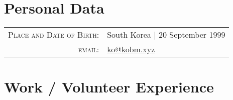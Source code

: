 \documentclass[a4paper,10pt]{article} %
\begin{document}
\pagestyle{empty} %


\par{\bigskip\par} %

\section{Personal Data}

\begin{tabular}{rl}
\textsc{Place and Date of Birth:} & South Korea  | 20 September 1999 \\
\textsc{email:} & \href{mailto:ko@kobm.xyz}{ko@kobm.xyz}\\
\end{tabular}


\section{Work / Volunteer Experience}
\end{document}
